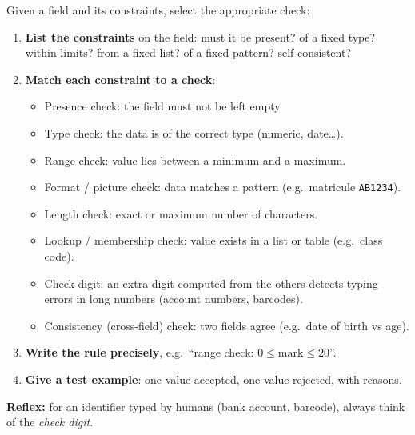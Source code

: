 \documentclass[11pt]{article}
\newcommand{\cle}[1]{{\popxbold\color{popdark}#1}}
\begin{document}
\begin{methode}
Given a field and its constraints, select the appropriate check:
\begin{enumerate}
\item \textbf{List the constraints} on the field: must it be present? of a fixed type? within limits? from a fixed list? of a fixed pattern? self-consistent?
\item \textbf{Match each constraint to a check}:
\begin{itemize}
\item \cle{Presence check}: the field must not be left empty.
\item \cle{Type check}: the data is of the correct type (numeric, date\ldots).
\item \cle{Range check}: value lies between a minimum and a maximum.
\item \cle{Format / picture check}: data matches a pattern (e.g.\ matricule \texttt{AB1234}).
\item \cle{Length check}: exact or maximum number of characters.
\item \cle{Lookup / membership check}: value exists in a list or table (e.g.\ class code).
\item \cle{Check digit}: an extra digit computed from the others detects typing errors in long numbers (account numbers, barcodes).
\item \cle{Consistency (cross-field) check}: two fields agree (e.g.\ date of birth vs age).
\end{itemize}
\item \textbf{Write the rule precisely}, e.g.\ ``range check: $0 \le \text{mark} \le 20$''.
\item \textbf{Give a test example}: one value accepted, one value rejected, with reasons.
\end{enumerate}
\textbf{Reflex:} for an identifier typed by humans (bank account, barcode), always think of the \emph{check digit}.
\end{methode}
\end{document}
